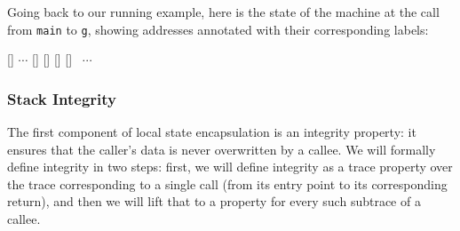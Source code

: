\documentclass[acmsmall,review,anonymous]{acmart}\settopmatter{printfolios=true,printccs=false,printacmref=false}
\begin{document}
{Going back to our running example, here is the state of the machine at
the call from {\tt main} to {\tt g}, showing addresses annotated with their
corresponding labels:
\vspace*{0.2em}
\begin{center}
\MemoryLabel{43.5em}{2em}{\SP}
[{\makebox[0pt]{$(\HIGHSEC,\HIGHINT)$}}]%
\hspace*{3pt}
$\cdots$
[{\makebox[0pt]{$(\HIGHSEC, \LOWINT)$}}]%
[{\makebox[0pt]{$(\HIGHSEC, \HIGHINT)$}}]%
[{\makebox[0pt]{$(\LOWSEC, \LOWINT)$}}]%
[{\makebox[0pt]{$(\HIGHSEC, \LOWINT)$}}]
~$\cdots$
\\
\end{center}



\subsubsection{Stack Integrity}

The first component of local state encapsulation is an integrity
property: it ensures that the caller's data is never overwritten by a
callee. We will formally define integrity in two steps: first, we will
define integrity as a trace property over the trace corresponding to a
single call (from its entry point to its corresponding return), and
then we will lift that to a property for every such subtrace of a
callee.


}
\end{document}
